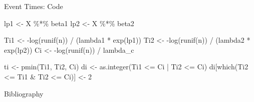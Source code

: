 \documentclass{beamer}
\newenvironment{Shaded}{\begin{snugshade}}{\end{snugshade}}
\newcommand{\DecValTok}[1]{\textcolor[rgb]{0.00,0.00,0.81}{{#1}}}
\newcommand{\SpecialCharTok}[1]{\textcolor[rgb]{0.00,0.00,0.00}{{#1}}}
\newcommand{\OtherTok}[1]{\textcolor[rgb]{0.56,0.35,0.01}{{#1}}}
\newcommand{\FunctionTok}[1]{\textcolor[rgb]{0.00,0.00,0.00}{{#1}}}
\newcommand{\NormalTok}[1]{{#1}}
\begin{document}
\begin{frame}[fragile]{Event Times: Code}
\protect\hypertarget{event-times-code}{}
\begin{Shaded}
\begin{Highlighting}[]
\NormalTok{  lp1 }\OtherTok{\textless{}{-}}\NormalTok{ X }\SpecialCharTok{\%*\%}\NormalTok{ beta1}
\NormalTok{  lp2 }\OtherTok{\textless{}{-}}\NormalTok{ X }\SpecialCharTok{\%*\%}\NormalTok{ beta2}

\NormalTok{  Ti1 }\OtherTok{\textless{}{-}} \SpecialCharTok{{-}}\FunctionTok{log}\NormalTok{(}\FunctionTok{runif}\NormalTok{(n)) }\SpecialCharTok{/}\NormalTok{ (lambda1 }\SpecialCharTok{*} \FunctionTok{exp}\NormalTok{(lp1))}
\NormalTok{  Ti2 }\OtherTok{\textless{}{-}} \SpecialCharTok{{-}}\FunctionTok{log}\NormalTok{(}\FunctionTok{runif}\NormalTok{(n)) }\SpecialCharTok{/}\NormalTok{ (lambda2 }\SpecialCharTok{*} \FunctionTok{exp}\NormalTok{(lp2))}
\NormalTok{  Ci  }\OtherTok{\textless{}{-}} \SpecialCharTok{{-}}\FunctionTok{log}\NormalTok{(}\FunctionTok{runif}\NormalTok{(n)) }\SpecialCharTok{/}\NormalTok{ lambda\_c}

\NormalTok{  ti }\OtherTok{\textless{}{-}} \FunctionTok{pmin}\NormalTok{(Ti1, Ti2, Ci)}
\NormalTok{  di }\OtherTok{\textless{}{-}} \FunctionTok{as.integer}\NormalTok{(Ti1 }\SpecialCharTok{\textless{}=}\NormalTok{ Ci }\SpecialCharTok{|}\NormalTok{ Ti2 }\SpecialCharTok{\textless{}=}\NormalTok{ Ci)}
\NormalTok{  di[}\FunctionTok{which}\NormalTok{(Ti2 }\SpecialCharTok{\textless{}=}\NormalTok{ Ti1 }\SpecialCharTok{\&}\NormalTok{ Ti2 }\SpecialCharTok{\textless{}=}\NormalTok{ Ci)] }\OtherTok{\textless{}{-}} \DecValTok{2}
\end{Highlighting}
\end{Shaded}
\end{frame}


\begin{frame}{Bibliography}

\printbibliography[heading=none]

\end{frame}
\end{document}
